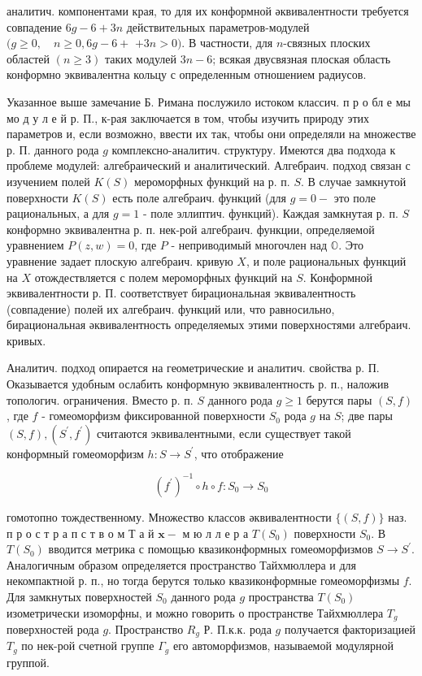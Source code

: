 \documentclass[10pt]{article}
\begin{document}
аналитич. компонентами края, то для их конформной әквивалентности требуется совпадение $6 g-6+3 n$ действительных параметров-модулей $(g \geqslant 0, \quad n \geqslant 0,6 g-6+$ $+3 n>0)$. В частности, для $n$-связных плоских областей $(n \geqslant 3)$ таких модулей $3 n-6$; всякая двусвязная плоская область конформно эквивалентна кольцу с определенным отношением радиусов.



Указанное выше замечание Б. Римана послужило истоком классич. п р о бл е мы мо д у л е й р. П., к-рая заключается в том, чтобы изучить природу этих параметров и, если возможно, ввести их так, чтобы они определяли на множестве р. П. данного рода $g$ комплексно-аналитич. структуру. Имеются два подхода к проблеме модулей: алгебраический и аналитический. Алгебраич. подход связан с изучением полей $K(S)$ мероморфных функций на р. п. $S$. В случае замкнутой поверхности $K(S)$ есть поле алгебраич. функций (для $g=0-$ это поле рациональных, а для $g=1$ - поле эллиптич. функций). Каждая замкнутая р. п. $S$ конформно эквивалентна р. п. нек-рой алгебраич. функции, определяемой уравнением $P(z, w)=0$, где $P$ - неприводимый многочлен над $\mathbb{O}$. Это уравнение задает плоскую алгебраич. кривую $X$, и поле рациональных функций на $X$ отождествляется с полем мероморфных функций на $S$. Конформной эквивалентности р. П. соответствует бирациональная эквивалентность (совпадение) полей их алгебраич. функций или, что равносильно, бирациональная әквивалентность определяемых этими поверхностями алгебраич. кривых.



Аналитич. подход опирается на геометрические и аналитич. свойства р. П. Оказывается удобным ослабить конформную эквивалентность р. п., наложив топологич. ограничения. Вместо р. п. $S$ данного рода $g \geqslant 1$ берутся пары $(S, f)$, где $f$ - гомеоморфизм фиксированной поверхности $S_{0}$ рода $g$ на $S$; две пары $(S, f),\left(S^{\prime}, f^{\prime}\right)$ считаются эквивалентными, если существует такой конформный гомеоморфизм $h: S \rightarrow S^{\prime}$, что отображение



\[

\left(f^{\prime}\right)^{-1} \circ h \circ f: S_{0} \longrightarrow S_{0}

\]



гомотопно тождественному. Множество классов әквивалентности $\{(S, f)\}$ наз. п р о с т р а п с т в о м Т а й $\mathbf{x}-$ м ю л л е р а $T\left(S_{0}\right)$ поверхности $S_{0}$. В $T\left(S_{0}\right)$ вводится метрика с помощью квазиконформных гомеоморфизмов $S \rightarrow S^{\prime}$. Аналогичным образом определяется пространство Тайхмюллера и для некомпактной р. п., но тогда берутся только квазиконформные гомеоморфизмы $f$. Для замкнутых поверхностей $S_{0}$ данного рода $g$ пространства $T\left(S_{0}\right)$ изометрически изоморфны, и можно говорить о пространстве Тайхмюллера $T_{g}$ поверхностей рода $g$. Пространство $R_{g}$ Р. П.к.к. рода $g$ получается факторизацией $T_{g}$ по нек-рой счетной группе $\Gamma_{g}$ его автоморфизмов, называемой модулярной группой.
\end{document}
